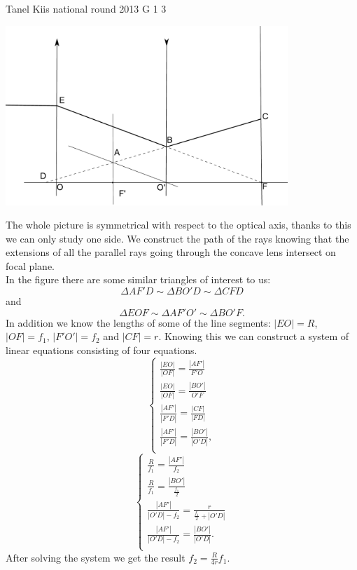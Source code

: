 \documentclass[11pt]{article}
\begin{document}
{Tanel Kiis} %
{national round} %
{2013} %
{G 1} %
{3} %
{

\ifEngSolution
\begin{center}
	\includegraphics[width=0.8\textwidth]{2013-v3g-01-laats_lah2}\\
\end{center}
The whole picture is symmetrical with respect to the optical axis, thanks to this we can only study one side. We construct the path of the rays knowing that the extensions of all the parallel rays going through the concave lens intersect on focal plane.\\
In the figure there are some similar triangles of interest to us:
$$\Delta AF'D \sim \Delta BO'D \sim \Delta CFD$$ 
and 
$$\Delta EOF \sim \Delta AF'O' \sim \Delta BO'F.$$ 
In addition we know the lengths of some of the line segments: $|EO| = R$, $|OF| = f_1$, $|F'O'| = f_2$ and $|CF| = r$. Knowing this we can construct a system of linear equations consisting of four equations.
\[ 
\begin{cases}
\frac{|EO|}{|OF|} = \frac{|AF'|}{F'O}\\
\frac{|EO|}{|OF|} = \frac{|BO'|}{O'F}\\
\frac{|AF'|}{|F'D|} = \frac{|CF|}{|FD|}\\
\frac{|AF'|}{|F'D|} = \frac{|BO'|}{|O'D|},\\
\end{cases}
\] 
\[ 
\begin{cases}
\frac{R}{f_1} = \frac{|AF'|}{f_2}\\
\frac{R}{f_1} = \frac{|BO'|}{\frac{f_1}{2}}\\
\frac{|AF'|}{|O'D| - f_2} = \frac{r}{\frac{f_1}{2} + |O'D|}\\
\frac{|AF'|}{|O'D| - f_2} = \frac{|BO'|}{|O'D|}.\\
\end{cases}
\]
After solving the system we get the result $f_2 = \frac{R}{4r}f_1$.\\

}
\end{document}

